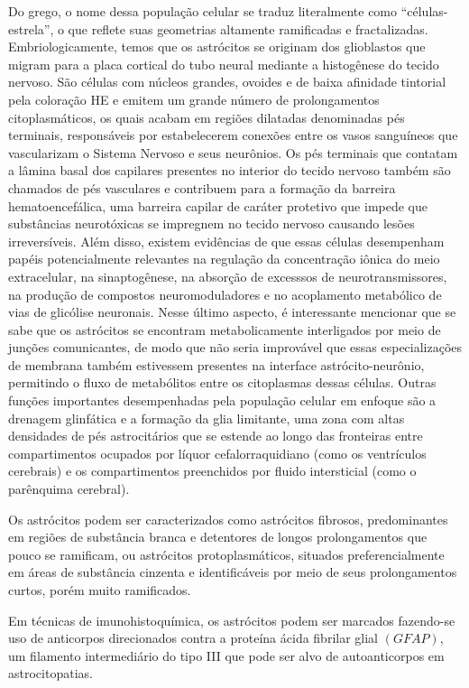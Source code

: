 \documentclass[
]{book}
\theoremstyle{definition}
\theoremstyle{definition}
\theoremstyle{definition}
\theoremstyle{definition}
\theoremstyle{remark}
\begin{document}
Do grego, o nome dessa população celular se traduz literalmente como ``células-estrela'', o que reflete suas geometrias altamente ramificadas e fractalizadas. Embriologicamente, temos que os astrócitos se originam dos glioblastos que migram para a placa cortical do tubo neural mediante a histogênese do tecido nervoso. São células com núcleos grandes, ovoides e de baixa afinidade tintorial pela coloração HE e emitem um grande número de prolongamentos citoplasmáticos, os quais acabam em regiões dilatadas denominadas pés terminais, responsáveis por estabelecerem conexões entre os vasos sanguíneos que vascularizam o Sistema Nervoso e seus neurônios. Os pés terminais que contatam a lâmina basal dos capilares presentes no interior do tecido nervoso também são chamados de pés vasculares e contribuem para a formação da barreira hematoencefálica, uma barreira capilar de caráter protetivo que impede que substâncias neurotóxicas se impregnem no tecido nervoso causando lesões irreversíveis. Além disso, existem evidências de que essas células desempenham papéis potencialmente relevantes na regulação da concentração iônica do meio extracelular, na sinaptogênese, na absorção de excesssos de neurotransmissores, na produção de compostos neuromoduladores e no acoplamento metabólico de vias de glicólise neuronais. Nesse último aspecto, é interessante mencionar que se sabe que os astrócitos se encontram metabolicamente interligados por meio de junções comunicantes, de modo que não seria improvável que essas especializações de membrana também estivessem presentes na interface astrócito-neurônio, permitindo o fluxo de metabólitos entre os citoplasmas dessas células. Outras funções importantes desempenhadas pela população celular em enfoque são a drenagem glinfática e a formação da glia limitante, uma zona com altas densidades de pés astrocitários que se estende ao longo das fronteiras entre compartimentos ocupados por líquor cefalorraquidiano (como os ventrículos cerebrais) e os compartimentos preenchidos por fluido intersticial (como o parênquima cerebral).

Os astrócitos podem ser caracterizados como astrócitos fibrosos, predominantes em regiões de substância branca e detentores de longos prolongamentos que pouco se ramificam, ou astrócitos protoplasmáticos, situados preferencialmente em áreas de substância cinzenta e identificáveis por meio de seus prolongamentos curtos, porém muito ramificados.

Em técnicas de imunohistoquímica, os astrócitos podem ser marcados fazendo-se uso de anticorpos direcionados contra a proteína ácida fibrilar glial \((GFAP)\), um filamento intermediário do tipo III que pode ser alvo de autoanticorpos em astrocitopatias.
\end{document}
